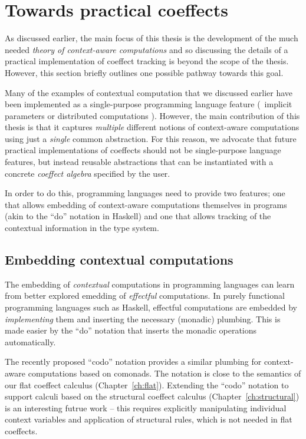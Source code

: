 \section{Towards practical coeffects}
\label{sec:conclusions-impl}

As discussed earlier, the main focus of this thesis is the development of the much needed 
\emph{theory of context-aware computations} and so discussing the details of a practical 
implementation of coeffect tracking is beyond the scope of the thesis. However, this section
briefly outlines one possible pathway towards this goal.

Many of the examples of contextual computation that we discussed earlier have been implemented as 
a single-purpose programming language feature (\eg~implicit parameters \cite{app-implicit-parameters} 
or distributed computations \cite{app-distributed-ml5,app-distributed-links}). However, 
the main contribution of this thesis is that it captures
\emph{multiple} different notions of context-aware computations using just a \emph{single}
common abstraction. For this reason, we advocate that future practical implementations of
coeffects should not be single-purpose language features, but instead reusable abstractions that
can be instantiated with a concrete \emph{coeffect algebra} specified by the user.

In order to do this, programming languages need to provide two features; one that allows 
embedding of context-aware computations themselves in programs (akin to the ``do'' notation
in Haskell) and one that allows tracking of the contextual information in the type system.


\subsection{Embedding contextual computations}

The embedding of \emph{contextual} computations in programming languages can learn from better 
explored emedding of \emph{effectful} computations. In purely functional programming languages
such as Haskell, effectful computations are embedded by \emph{implementing} them and inserting the
necessary (monadic) plumbing. This is made easier by the ``do'' notation \cite{other-haskell98} 
that inserts the monadic operations automatically.

The recently proposed ``codo'' notation \cite{comonads-codo} provides a similar plumbing for
context-aware computations based on comonads. The notation is close to the semantics of our 
flat coeffect calculus (Chapter~\ref{ch:flat}). Extending the ``codo'' notation to support calculi based 
on the structural coeffect calculus (Chapter~\ref{ch:structural}) is an interesting futrue work -- 
this requires explicitly manipulating individual context variables and application of structural
rules, which is not needed in flat coeffects.

